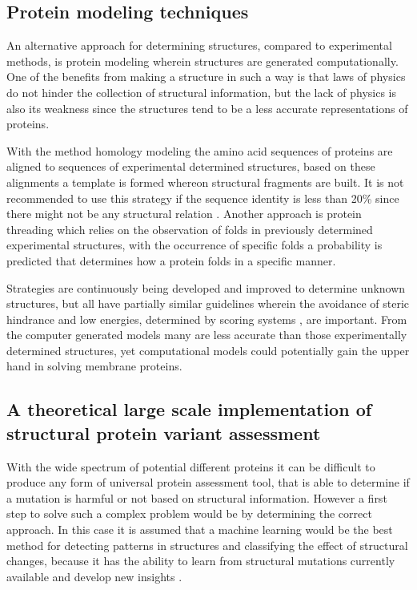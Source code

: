 \subsection{Protein modeling techniques}
An alternative approach for determining structures, compared to experimental methods, is protein modeling wherein structures are generated computationally. One of the benefits from making a structure in such a way is that laws of physics do not hinder the collection of structural information, but the lack of physics is also its weakness since the structures tend to be a less accurate representations of proteins.

With the method homology modeling the amino acid sequences of proteins are aligned to sequences of experimental determined structures, based on these alignments a template is formed whereon structural fragments are built. It is not recommended to use this strategy if the sequence identity is less than 20\% since there might not be any structural relation \cite{chothia_relation_1986}.
Another approach is protein threading which relies on the observation of folds in previously determined experimental structures, with the occurrence of specific folds a probability is predicted that determines how a protein folds in a specific manner. 

Strategies are continuously being developed and improved to determine unknown structures, but all have partially similar guidelines wherein the avoidance of steric hindrance \cite{wikipedia_ramachandran_2019} and low energies, determined by scoring systems \cite{shourya_scoring_nodate}, are important. From the computer generated models many are less accurate than those experimentally determined structures, yet computational models could potentially gain the upper hand in solving membrane proteins\cite{yonath_x-ray_2011}.
\label{subsec:GD_Protein_modeling_techniques}

\subsection{A theoretical large scale implementation of structural protein variant assessment}
With the wide spectrum of potential different proteins it can be difficult to produce any form of universal protein assessment tool, that is able to determine if a mutation is harmful or not based on structural information. However a first step to solve such a complex problem would be by determining the correct approach. In this case it is assumed that a machine learning would be the best method for detecting patterns in structures and classifying the effect of structural changes, because it has the ability to learn from structural mutations currently available and develop new insights \cite{evans_alphafold:_nodate}.

